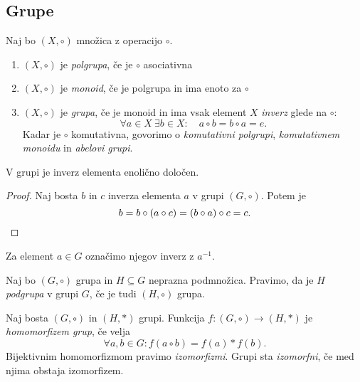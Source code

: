 \documentclass[12pt, a4paper]{article}
\begin{document}
\newpage

\subsection{Grupe}

\begin{okvir}
\begin{definicija}
Naj bo $(X,\circ)$ množica z operacijo $\circ$.

\begin{enumerate}[label=\roman*)]
\item $(X,\circ)$ je \emph{polgrupa}, če je $\circ$ asociativna
\item $(X,\circ)$ je \emph{monoid}, če je polgrupa in ima enoto za $\circ$
\item $(X,\circ)$ je \emph{grupa}, če je monoid in ima vsak element $X$ \emph{inverz} glede na $\circ$:
\[
\forall a\in X~\exists b\in X\colon \quad a\circ b=b\circ a=e.
\]
Kadar je $\circ$ komutativna, govorimo o \emph{komutativni polgrupi}, \emph{komutativnem monoidu} in \emph{abelovi grupi}.
\end{enumerate}
\end{definicija}
\end{okvir}

\begin{trditev}
V grupi je inverz elementa enolično določen.
\end{trditev}

\begin{proof}
Naj bosta $b$ in $c$ inverza elementa $a$ v grupi $(G,\circ)$. Potem je
\[
b=b\circ (a\circ c)=(b\circ a)\circ c=c.\qedhere
\]
\end{proof}

Za element $a\in G$ označimo njegov inverz z $a^{-1}$.

\begin{definicija}
Naj bo $(G,\circ)$ grupa in $H\subseteq G$ neprazna podmnožica. Pravimo, da je $H$ \emph{podgrupa} v grupi $G$, če je tudi $(H,\circ)$ grupa.
\end{definicija}

\begin{definicija}
Naj bosta $(G,\circ)$ in $(H,*)$ grupi. Funkcija $f\colon (G,\circ)\to(H,*)$ je \emph{homomorfizem grup}, če velja
\[
\forall a,b\in G\colon f(a\circ b)=f(a)*f(b).
\]
Bijektivnim homomorfizmom pravimo \emph{izomorfizmi}. Grupi sta \emph{izomorfni}, če med njima obstaja izomorfizem.
\end{definicija}
\end{document}
